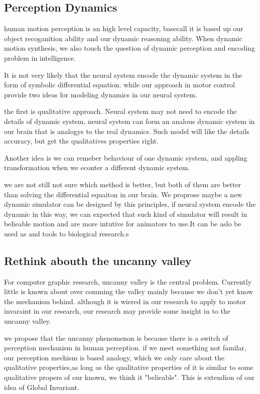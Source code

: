 \subsection{Perception Dynamics}
human motion perception is an high level capacity, basecall it is based up our object recoganition ability and our dynamic reasoning ability.
When dynamic motion synthesis, we also touch the question of dynamic perception and encoding problem in intelligence.

It is not very likely that the neural system encode the dynamic system in the form of symbolic differential equation.
while our approach in motor control provide two ideas for modeling dynamics in our neural system.

the first is qualitative approach.
Neural system may not need to encode the details of dynamic system, neural system can form an analous dynamic system in our brain that is analogys to the real dynamics.
Such model will like the details accuracy, but get the qualitatives properties right.

Another idea is we can remeber behaviour of one dynamic system, and appling transformation when we econter a different dynamic system.


we are not still not sure which method is better, but both of them are better than solving the differential equaiton in our brain.
We proprose maybe a new dynamic simulator can be designed by this principles, if neural system encode the dynamic in this way, we can expected that such kind of simulator will result in belieable motion and are more intutive for animators to use.It can be aslo be used as and tools to biological research.s
\subsection{Rethink abouth the uncanny valley}
For computer graphic research, uncanny valley is the central problem. Currently little is known about over comming the valley mainly because we don't yet know the mechanism behind.
although it is wiered in our research to apply to motor invaraint in our research,
our research may provide some insight in to the uncanny valley.

we propose that the uncanny phenomenon is because there is a switch of perception mechanism in human perception.
if we meet something not familar, our perception mechism is based analogy, which we only care about the qualitative properties,as long as the qualitative properties of it is similar to some qualitative propers of our known, we think it "belieable". This is extendion of our idea of Global Invariant.

